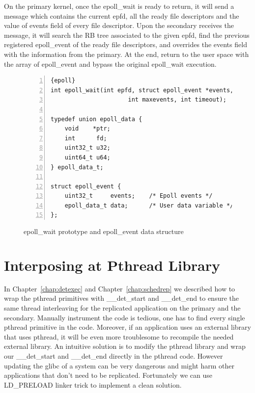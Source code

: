 On the primary kernel, once the epoll\_wait is ready to return, it will send a message which contains the current epfd, all the ready file descriptors and the value of events field of every file descriptor. Upon the secondary receives the message, it will search the RB tree associated to the given epfd, find the previous registered epoll\_event of the ready file descriptors, and overrides the events field with the information from the primary. At the end, return to the user space with the array of epoll\_event and bypass the original epoll\_wait execution.

\begin{figure}
\begin{lstlisting}[numbers=left, frame=single, basicstyle=\small, breaklines]{epoll}
int epoll_wait(int epfd, struct epoll_event *events,
                      int maxevents, int timeout);

typedef union epoll_data {
    void    *ptr;
    int      fd;
    uint32_t u32;
    uint64_t u64;
} epoll_data_t;

struct epoll_event {
    uint32_t     events;    /* Epoll events */
    epoll_data_t data;      /* User data variable */
};

\end{lstlisting}
\caption{epoll\_wait prototype and epoll\_event data structure}
\label{f:epoll}
\end{figure}

\section{Interposing at Pthread Library} \label{sec:library}
In Chapter~\ref{chap:detexec} and Chapter~\ref{chap:schedrep} we described how to wrap the pthread primitives with \_\_det\_start and \_\_det\_end to ensure the same thread interleaving for the replicated application on the primary and the secondary. Manually instrument the code is tedious, one has to find every single pthread primitive in the code. Moreover, if an application uses an external library that uses pthread, it will be even more troublesome to recompile the needed external library. An intuitive solution is to modify the pthread library and wrap our \_\_det\_start and \_\_det\_end directly in the pthread code. However updating the glibc of a system can be very dangerous and might harm other applications that don't need to be replicated. Fortunately we can use LD\_PRELOAD linker trick to implement a clean solution.

